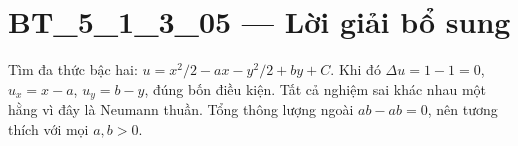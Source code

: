 \documentclass[10pt,a4paper]{article}
\begin{document}
\section*{BT\_5\_1\_3\_05 — Lời giải bổ sung}
Tìm đa thức bậc hai: $u=x^2/2-ax-y^2/2+by+C$. Khi đó $\Delta u=1-1=0$, $u_x=x-a$, $u_y=b-y$, đúng bốn điều kiện. Tất cả nghiệm sai khác nhau một hằng vì đây là Neumann thuần. Tổng thông lượng ngoài $ab-ab=0$, nên tương thích với mọi $a,b>0$.
\end{document}
